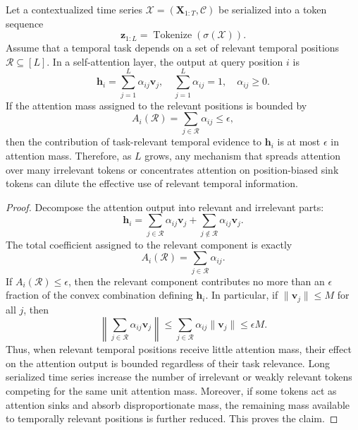 \begin{proposition}
\label{prop:long_context_dilution}
Let a contextualized time series $\mathcal{X}=(\mathbf{X}_{1:T},\mathcal{C})$
be serialized into a token sequence
\begin{equation}
    \mathbf{z}_{1:L}=\operatorname{Tokenize}(\sigma(\mathcal{X})).
\end{equation}
Assume that a temporal task depends on a set of relevant temporal positions
$\mathcal{R}\subseteq [L]$. In a self-attention layer, the output at query
position $i$ is
\begin{equation}
    \mathbf{h}_i
    =
    \sum_{j=1}^{L}\alpha_{ij}\mathbf{v}_j,
    \quad
    \sum_{j=1}^{L}\alpha_{ij}=1,\quad \alpha_{ij}\geq 0 .
\end{equation}
If the attention mass assigned to the relevant positions is bounded by
\begin{equation}
    A_i(\mathcal{R})=\sum_{j\in\mathcal{R}}\alpha_{ij}\leq \epsilon,
\end{equation}
then the contribution of task-relevant temporal evidence to $\mathbf{h}_i$ is
at most $\epsilon$ in attention mass. Therefore, as $L$ grows, any mechanism that
spreads attention over many irrelevant tokens or concentrates attention on
position-biased sink tokens can dilute the effective use of relevant temporal
information.
\end{proposition}

\begin{proof}
Decompose the attention output into relevant and irrelevant parts:
\begin{equation}
    \mathbf{h}_i
    =
    \sum_{j\in\mathcal{R}}\alpha_{ij}\mathbf{v}_j
    +
    \sum_{j\notin\mathcal{R}}\alpha_{ij}\mathbf{v}_j .
\end{equation}
The total coefficient assigned to the relevant component is exactly
\begin{equation}
    A_i(\mathcal{R})=\sum_{j\in\mathcal{R}}\alpha_{ij}.
\end{equation}
If $A_i(\mathcal{R})\leq \epsilon$, then the relevant component contributes no
more than an $\epsilon$ fraction of the convex combination defining
$\mathbf{h}_i$. In particular, if $\|\mathbf{v}_j\|\leq M$ for all $j$, then
\begin{equation}
    \left\|
    \sum_{j\in\mathcal{R}}\alpha_{ij}\mathbf{v}_j
    \right\|
    \leq
    \sum_{j\in\mathcal{R}}\alpha_{ij}\|\mathbf{v}_j\|
    \leq
    \epsilon M.
\end{equation}
Thus, when relevant temporal positions receive little attention mass, their
effect on the attention output is bounded regardless of their task relevance.
Long serialized time series increase the number of irrelevant or weakly relevant
tokens competing for the same unit attention mass. Moreover, if some tokens act
as attention sinks and absorb disproportionate mass, the remaining mass available
to temporally relevant positions is further reduced. This proves the claim.
\end{proof}


